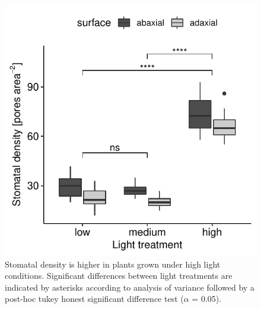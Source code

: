 \documentclass[12pt,halfline,a4paper,]{ouparticle}
\begin{document}
\begin{figure}[ht]
\includegraphics[width = \textwidth]{figures/density.pdf}
\caption{Stomatal density is higher in plants grown under high light conditions. Significant differences between light treatments are indicated by asterisks according to analysis of variance followed by a post-hoc tukey honest significant difference test ($\alpha$ = 0.05).}
\label{fig:density}
\end{figure}
\end{document}
